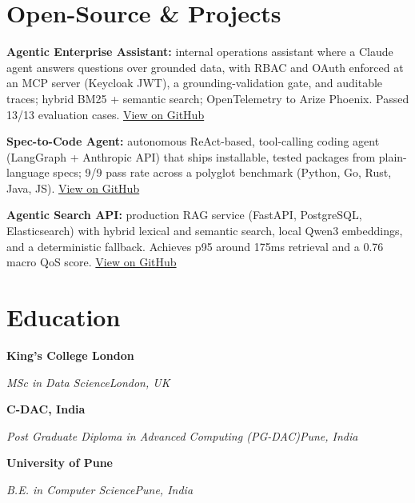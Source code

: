 \documentclass[10pt,a4paper]{article}
\newcommand{\entry}[4]{%
  {\color{company}\bfseries #1}\hfill {\color{muted}#2}\par
  \vspace{1pt}
  {\itshape #3}\hfill {\color{muted}\itshape #4}\par
  \vspace{3pt}%
}
\begin{document}
\section{Open-Source \& Projects}
\begin{tight}
  \item \textbf{Agentic Enterprise Assistant:} internal operations assistant where a Claude agent answers questions over grounded data, with RBAC and OAuth enforced at an MCP server (Keycloak JWT), a grounding-validation gate, and auditable traces; hybrid BM25 + semantic search; OpenTelemetry to Arize Phoenix. Passed 13/13 evaluation cases. \href{https://github.com/abhijeetscode/Agentic-Enterprise-Assistant}{View on GitHub}
  \item \textbf{Spec-to-Code Agent:} autonomous ReAct-based, tool-calling coding agent (LangGraph + Anthropic API) that ships installable, tested packages from plain-language specs; 9/9 pass rate across a polyglot benchmark (Python, Go, Rust, Java, JS). \href{https://github.com/abhijeetscode/Spec-to-Code-Agent}{View on GitHub}
  \item \textbf{Agentic Search API:} production RAG service (FastAPI, PostgreSQL, Elasticsearch) with hybrid lexical and semantic search, local Qwen3 embeddings, and a deterministic fallback. Achieves p95 around 175ms retrieval and a 0.76 macro QoS score. \href{https://github.com/abhijeetscode/search-agent}{View on GitHub}
\end{tight}

\section{Education}
\entry{King's College London}{}{MSc in Data Science}{London, UK}
\vspace{-3pt}
\entry{C-DAC, India}{}{Post Graduate Diploma in Advanced Computing (PG-DAC)}{Pune, India}
\vspace{-3pt}
\entry{University of Pune}{}{B.E. in Computer Science}{Pune, India}
\end{document}
